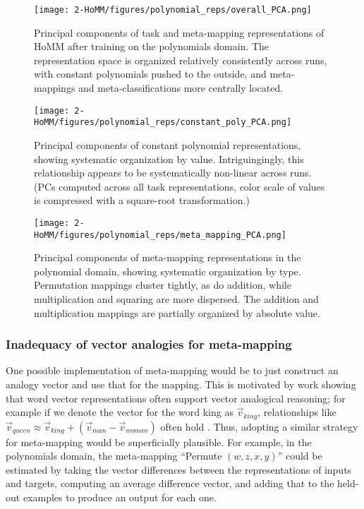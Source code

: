 \begin{figure}[ptbh]
\centering
\texttt{[image: 2-HoMM/figures/polynomial\_reps/overall\_PCA.png]}
\caption[Principal components of task and meta-mapping representations of HoMM after training on the polynomials domain.]{Principal components of task and meta-mapping representations of HoMM after training on the polynomials domain. The representation space is organized relatively consistently across runs, with constant polynomials pushed to the outside, and meta-mappings and meta-classifications more centrally located.} \label{fig:HoMM_polynomials:reps_overall_PCA}
\end{figure}

\begin{figure}[ptbh]
\centering
\texttt{[image: 2-HoMM/figures/polynomial\_reps/constant\_poly\_PCA.png]}
\caption[Principal components of constant polynomial representations, showing systematic organization by value.]{Principal components of constant polynomial representations, showing systematic organization by value. Intriguingingly, this relationship appears to be systematically non-linear across runs. (PCs computed across all task representations, color scale of values is compressed with a square-root transformation.)} \label{fig:HoMM_polynomials:reps_const_poly_PCA}
\end{figure}

\begin{figure}[ptbh]
\centering
\texttt{[image: 2-HoMM/figures/polynomial\_reps/meta\_mapping\_PCA.png]}
\caption[Principal components of meta-mapping representations in the polynomial domain, showing systematic organization by type.]{Principal components of meta-mapping representations in the polynomial domain, showing systematic organization by type. Permutation mappings cluster tightly, as do addition, while multiplication and squaring are more dispersed. The addition and multiplication mappings are partially organized by absolute value.} \label{fig:HoMM_polynomials:reps_meta_mapping_PCA}
\end{figure}

\subsubsection{Inadequacy of vector analogies for meta-mapping} \label{sec:HoMM:vector_analogies_inadequate}

One possible implementation of meta-mapping would be to just construct an analogy vector and use that for the mapping. This is motivated by work showing that word vector representations often support vector analogical reasoning; for example if we denote the vector for the word king as \(\vec{v}_{king}\), relationships like \(\vec{v}_{queen} \approx \vec{v}_{king} + \left(\vec{v}_{man} - \vec{v}_{woman} \right)\) often hold \citep{Mikolov2013}. Thus, adopting a similar strategy for meta-mapping would be superficially plausible. For example, in the polynomials domain, the meta-mapping ``Permute \((w, z, x, y)\)'' could be estimated by taking the vector differences between the representations of inputs and targets, computing an average difference vector, and adding that to the held-out examples to produce an output for each one.

